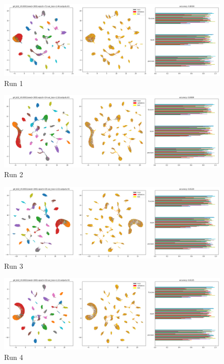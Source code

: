 \documentclass{article}
\begin{document}
\begin{figure}[h!]
  \includegraphics[width=\linewidth]{new_journal/figures/experiments/roznet_multi/8_heads/run1.png}
  \caption{Run 1}
\end{figure}

\begin{figure}[h!]
  \includegraphics[width=\linewidth]{new_journal/figures/experiments/roznet_multi/8_heads/run2.png}
  \caption{Run 2}
\end{figure}

\begin{figure}[h!]
  \includegraphics[width=\linewidth]{new_journal/figures/experiments/roznet_multi/8_heads/run3.png}
  \caption{Run 3}
\end{figure}

\begin{figure}[h!]
  \includegraphics[width=\linewidth]{new_journal/figures/experiments/roznet_multi/8_heads/run4.png}
  \caption{Run 4}
\end{figure}
\end{document}
